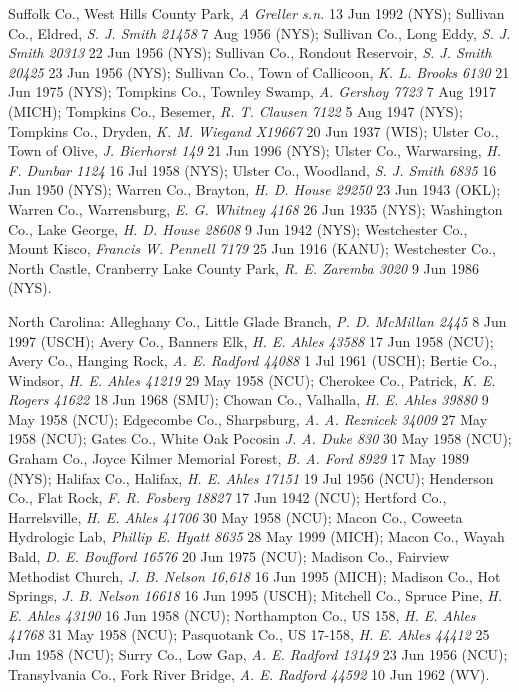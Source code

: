 \documentclass{article}
\begin{document}
Suffolk Co., West Hills County Park, \textit{A Greller s.n.} 13 Jun 1992 (NYS);
Sullivan Co., Eldred, \textit{S. J. Smith 21458} 7 Aug 1956 (NYS);
Sullivan Co., Long Eddy, \textit{S. J. Smith 20313} 22 Jun 1956 (NYS);
Sullivan Co., Rondout Reservoir, \textit{S. J. Smith 20425} 23 Jun 1956 (NYS);
Sullivan Co., Town of Callicoon, \textit{K. L. Brooks 6130} 21 Jun 1975 (NYS);
Tompkins Co., Townley Swamp, \textit{A. Gershoy 7723} 7 Aug 1917 (MICH);
Tompkins Co., Besemer, \textit{R. T. Clausen 7122} 5 Aug 1947 (NYS);
Tompkins Co., Dryden, \textit{K. M. Wiegand X19667} 20 Jun 1937 (WIS);
Ulster Co., Town of Olive, \textit{J. Bierhorst 149} 21 Jun 1996 (NYS);
Ulster Co., Warwarsing, \textit{H. F. Dunbar 1124} 16 Jul 1958 (NYS);
Ulster Co., Woodland, \textit{S. J. Smith 6835} 16 Jun 1950 (NYS);
Warren Co., Brayton, \textit{H. D. House 29250} 23 Jun 1943 (OKL);
Warren Co., Warrensburg, \textit{E. G. Whitney 4168} 26 Jun 1935 (NYS);
Washington Co., Lake George, \textit{H. D. House 28608} 9 Jun 1942 (NYS);
Westchester Co., Mount Kisco, \textit{Francis W. Pennell 7179} 25 Jun 1916 (KANU);
Westchester Co., North Castle, Cranberry Lake County Park, \textit{R. E. Zaremba 3020} 9 Jun 1986 (NYS).

North Carolina:
Alleghany Co., Little Glade Branch, \textit{P. D. McMillan 2445} 8 Jun 1997 (USCH);
Avery Co., Banners Elk, \textit{H. E. Ahles 43588} 17 Jun 1958 (NCU);
Avery Co., Hanging Rock, \textit{A. E. Radford 44088} 1 Jul 1961 (USCH);
Bertie Co., Windsor, \textit{H. E. Ahles 41219} 29 May 1958 (NCU);
Cherokee Co., Patrick, \textit{K. E. Rogers 41622} 18 Jun 1968 (SMU);
Chowan Co., Valhalla, \textit{H. E. Ahles 39880} 9 May 1958 (NCU);
Edgecombe Co., Sharpsburg, \textit{A. A. Reznicek 34009} 27 May 1958 (NCU);
Gates Co., White Oak Pocosin \textit{J. A. Duke 830} 30 May 1958 (NCU);
Graham Co., Joyce Kilmer Memorial Forest, \textit{B. A. Ford 8929} 17 May 1989 (NYS);
Halifax Co., Halifax, \textit{H. E. Ahles 17151} 19 Jul 1956 (NCU);
Henderson Co., Flat Rock, \textit{F. R. Fosberg 18827} 17 Jun 1942 (NCU);
Hertford Co., Harrelsville, \textit{H. E. Ahles 41706} 30 May 1958 (NCU);
Macon Co., Coweeta Hydrologic Lab, \textit{Phillip E. Hyatt 8635} 28 May 1999 (MICH);
Macon Co., Wayah Bald, \textit{D. E. Boufford 16576} 20 Jun 1975 (NCU);
Madison Co., Fairview Methodist Church, \textit{J. B. Nelson 16,618} 16 Jun 1995 (MICH);
Madison Co., Hot Springs, \textit{J. B. Nelson 16618} 16 Jun 1995 (USCH);
Mitchell Co., Spruce Pine, \textit{H. E. Ahles 43190} 16 Jun 1958 (NCU);
Northampton Co., US 158, \textit{H. E. Ahles 41768} 31 May 1958 (NCU);
Pasquotank Co., US 17-158, \textit{H. E. Ahles 44412} 25 Jun 1958 (NCU);
Surry Co., Low Gap, \textit{A. E. Radford 13149} 23 Jun 1956 (NCU);
Transylvania Co., Fork River Bridge, \textit{A. E. Radford 44592} 10 Jun 1962 (WV).
\end{document}
